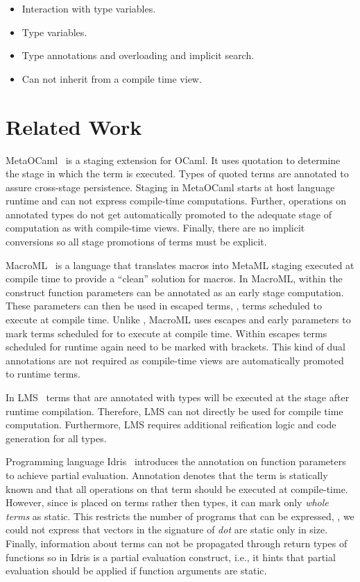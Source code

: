 \begin{itemize}
\item Interaction with type variables.
\item Type variables.
\item Type annotations and overloading and implicit search.
\item Can not inherit from a compile time view.
\end{itemize}


\section{Related Work}
\label{sct:related-work}

MetaOCaml~\cite{taha_multi-stage_1997,calcagno2003implementing} is a staging extension
 for OCaml. It uses quotation to determine the stage in which the term is executed. Types of quoted terms are annotated
 to assure cross-stage persistence. Staging in MetaOCaml starts at host language runtime and
 can not express compile-time computations. Further, operations on annotated types
 do not get automatically promoted to the adequate stage of computation as with compile-time views.
 Finally, there are no implicit conversions so all stage promotions of terms must be explicit.

MacroML~\cite{ganz2001macros} is a language that translates macros into MetaML staging executed
 at compile time to provide a ``clean'' solution for macros. In MacroML, within
 the  construct function parameters can be annotated as an early stage computation. These parameters
 can then be used in escaped terms, \ie, terms scheduled to execute at compile time. Unlike \tool, MacroML
 uses escapes and early parameters to mark terms scheduled for to execute at compile time. Within
 escapes terms scheduled for runtime again need to be marked with brackets. This kind of dual annotations are
 not required as compile-time views are automatically promoted to runtime terms.

In LMS~\cite{rompf2012lightweight} terms that are annotated with  types will be executed at
 the stage after runtime compilation. Therefore, LMS can not directly be used for compile time computation. Furthermore,
 LMS requires additional reification logic and code generation for all  types.

 Programming language Idris~\cite{brady2010scrapping} introduces the  annotation
  on function parameters to achieve partial evaluation. Annotation  denotes
  that the term is statically known and that all operations on that term should
  be executed at compile-time. However, since  is placed on terms rather
  then types, it can mark only \emph{whole terms} as static. This restricts the number
  of programs that can be expressed, \eg, we could not express that vectors in the
  signature of \emph{dot} are static only in size. Finally, information about 
  terms can not be propagated through return types of functions so 
  in Idris is a partial evaluation construct, i.e., it hints that partial evaluation
  should be applied if function arguments are static.

